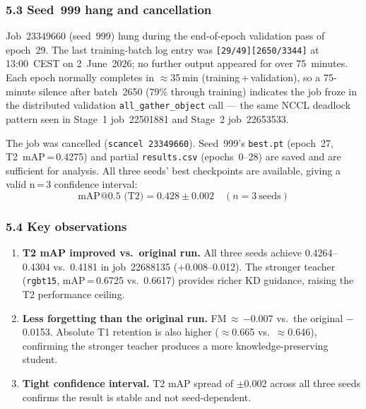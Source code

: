 \subsubsection*{5.3 Seed~999 hang and cancellation}

Job~23349660 (seed~999) hung during the end-of-epoch validation pass
of epoch~29. The last training-batch log entry was
\texttt{[29/49][2650/3344]} at 13:00~CEST on 2~June~2026; no further
output appeared for over 75~minutes. Each epoch normally completes in
$\approx$35\,min (training\,+\,validation), so a 75-minute silence
after batch~2650 (79\% through training) indicates the job froze in
the distributed validation \texttt{all\_gather\_object} call ---
the same NCCL deadlock pattern seen in Stage~1 job~22501881 and
Stage~2 job~22653533.

The job was cancelled (\texttt{scancel 23349660}).
Seed~999's \texttt{best.pt} (epoch~27, T2~mAP\,=\,0.4275) and
partial \texttt{results.csv} (epochs~0--28) are saved and are
sufficient for analysis. All three seeds' best checkpoints are
available, giving a valid n\,=\,3 confidence interval:
\[
    \text{mAP@0.5 (T2)} = 0.428 \pm 0.002 \quad (n = 3\ \text{seeds})
\]

\subsubsection*{5.4 Key observations}

\begin{enumerate}
    \item \textbf{T2 mAP improved vs.\ original run.}
          All three seeds achieve 0.4264--0.4304 vs.\ 0.4181 in
          job~22688135 ($+$0.008--0.012). The stronger teacher
          (\texttt{rgbt15}, mAP\,=\,0.6725 vs.\ 0.6617) provides
          richer KD guidance, raising the T2 performance ceiling.

    \item \textbf{Less forgetting than the original run.}
          FM\,$\approx$\,$-$0.007 vs.\ the original $-$0.0153.
          Absolute T1 retention is also higher ($\approx$0.665 vs.\
          $\approx$0.646), confirming the stronger teacher produces
          a more knowledge-preserving student.

    \item \textbf{Tight confidence interval.}
          T2 mAP spread of $\pm$0.002 across all three seeds confirms
          the result is stable and not seed-dependent.
\end{enumerate}

